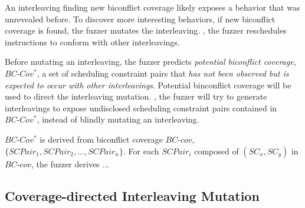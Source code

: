 %
An interleaving finding new biconflict coverage likely exposes a
behavior that was unrevealed before.
%
To discover more interesting behaviors, if new biconflict coverage is
found, the fuzzer mutates the interleaving. \ie, the fuzzer
reschedules instructions to conform with other interleavings.

Before mutating an interleaving, the fuzzer predicts \textit{potential
  biconflict coverage}, $BC\mbox{-}Cov^*$, a set of scheduling
constraint pairs that \textit{has not been observed but is expected to
  occur with other interleavings}.
%
Potential binconflict coverage will be used to direct the interleaving
mutation. \ie, the fuzzer will try to generate interleavings to expose
undisclosed scheduling constraint pairs contained in
$BC\mbox{-}Cov^*$, instead of blindly mutating an interleaving.


$BC\mbox{-}Cov^*$ is derived from biconflict coverage $BC\mbox{-}cov$,
$\{SCPair_1, SCPair_2, ..., SCPair_n\}$.
%
For each $SCPair_i$ composed of $(SC_x, SC_y)$ in $BC\mbox{-}cov$, the
fuzzer derives ...



\subsection{Coverage-directed Interleaving Mutation}
\label{ss:scheduler}


